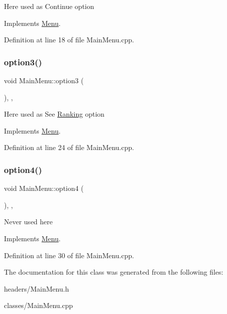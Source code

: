 Here used as Continue option 

Implements \hyperlink{classMenu}{Menu}.



Definition at line 18 of file Main\+Menu.\+cpp.

\mbox{\label{classMainMenu_a97fe096cec584b02614f759d7fcef8d1}} 
\subsubsection{\texorpdfstring{option3()}{option3()}}
{\footnotesize\ttfamily void Main\+Menu\+::option3 (\begin{DoxyParamCaption}{ }\end{DoxyParamCaption})\hspace{0.3cm}{\ttfamily [override]}, {\ttfamily [private]}, {\ttfamily [virtual]}}

Here used as See \hyperlink{classRanking}{Ranking} option 

Implements \hyperlink{classMenu}{Menu}.



Definition at line 24 of file Main\+Menu.\+cpp.

\mbox{\label{classMainMenu_a2097f6d1d30bad0b5c6e28575a48cc3e}} 
\subsubsection{\texorpdfstring{option4()}{option4()}}
{\footnotesize\ttfamily void Main\+Menu\+::option4 (\begin{DoxyParamCaption}{ }\end{DoxyParamCaption})\hspace{0.3cm}{\ttfamily [override]}, {\ttfamily [private]}, {\ttfamily [virtual]}}

Never used here 

Implements \hyperlink{classMenu}{Menu}.



Definition at line 30 of file Main\+Menu.\+cpp.



The documentation for this class was generated from the following files\+:\begin{DoxyCompactItemize}
\item 
headers/Main\+Menu.\+h\item 
classes/Main\+Menu.\+cpp\end{DoxyCompactItemize}
